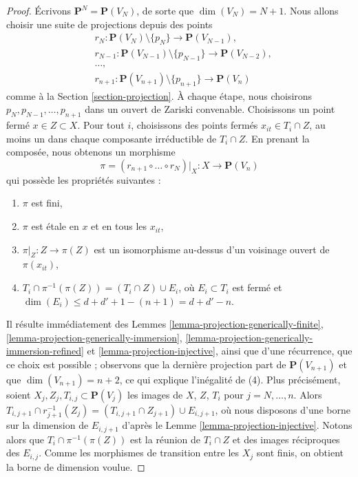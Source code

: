 \begin{proof}
Écrivons $\mathbf{P}^N = \mathbf{P}(V_N)$, de sorte que $\dim(V_N) = N + 1$.
Nous allons choisir une suite de projections depuis des points
\begin{align*}
& r_N : 
\mathbf{P}(V_N) \setminus \{p_N\} \to \mathbf{P}(V_{N - 1}), \\
& r_{N - 1} :
\mathbf{P}(V_{N - 1}) \setminus \{p_{N - 1}\} \to \mathbf{P}(V_{N - 2}), \\
& \ldots,\\
& r_{n + 1} :
\mathbf{P}(V_{n + 1}) \setminus \{p_{n + 1}\} \to \mathbf{P}(V_n)
\end{align*}
comme à la Section \ref{section-projection}. À chaque étape, nous choisirons
$p_N, p_{N - 1}, \ldots, p_{n + 1}$ dans un ouvert de Zariski convenable.
Choisissons un point fermé $x \in Z \subset X$. Pour tout $i$, choisissons des
points fermés $x_{it} \in T_i \cap Z$, au moins un dans chaque composante irréductible
de $T_i \cap Z$. En prenant la composée, nous obtenons
un morphisme
$$
\pi = (r_{n + 1} \circ \ldots \circ r_N)|_X :
X \longrightarrow \mathbf{P}(V_n)
$$
qui possède les propriétés suivantes :
\begin{enumerate}
\item $\pi$ est fini,
\item $\pi$ est \'etale en $x$ et en tous les $x_{it}$,
\item $\pi|_Z : Z \to \pi(Z)$ est un isomorphisme
au-dessus d'un voisinage ouvert de $\pi(x_{it})$,
\item $T_i \cap \pi^{-1}(\pi(Z)) = (T_i \cap Z) \cup E_i$, où
$E_i \subset T_i$ est fermé et
$\dim(E_i) \leq d + d' + 1 - (n + 1) = d + d' - n$.
\end{enumerate}
Il résulte immédiatement des
Lemmes \ref{lemma-projection-generically-finite},
\ref{lemma-projection-generically-immersion},
\ref{lemma-projection-generically-immersion-refined} et
\ref{lemma-projection-injective}, ainsi que d'une récurrence, que ce choix est possible ;
observons que la dernière projection part de $\mathbf{P}(V_{n + 1})$ et que
$\dim(V_{n + 1}) = n + 2$, ce qui explique l'inégalité de (4). Plus
précisément, soient $X_j, Z_j, T_{i, j} \subset \mathbf{P}(V_j)$ les images
de $X$, $Z$, $T_i$ pour $j = N, \ldots, n$. Alors
$T_{i, j + 1} \cap r_{j + 1}^{-1}(Z_j) = (T_{i, j + 1} \cap Z_{j + 1})
\cup E_{i, j + 1}$, où nous disposons d'une borne sur la dimension de $E_{i, j + 1}$
d'après le Lemme \ref{lemma-projection-injective}. Notons alors que
$T_i \cap \pi^{-1}(\pi(Z))$ est la réunion de $T_i \cap Z$
et des images réciproques des $E_{i, j}$. Comme les morphismes de transition
entre les $X_j$ sont finis, on obtient la borne de dimension voulue.


\end{proof}
